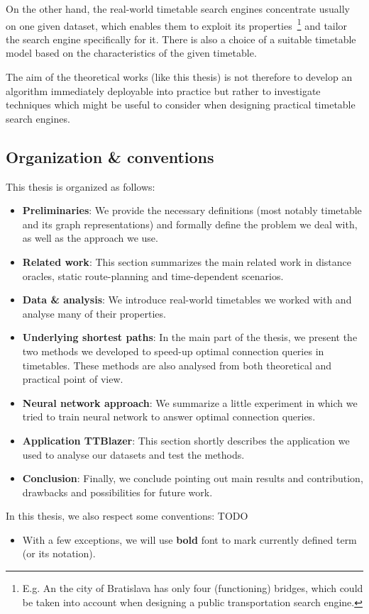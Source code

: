 	On the other hand, the real-world timetable search engines concentrate usually on one given dataset, which enables them to exploit its properties~\footnote{E.g. An the city of Bratislava has only four (functioning) bridges, which could be taken into account when designing a public transportation search engine.} and tailor the search engine specifically for it. There is also a choice of a suitable timetable model based on the characteristics of the given timetable.
	
	The aim of the theoretical works (like this thesis) is not therefore to develop an algorithm immediately deployable into practice but rather to investigate techniques which might be useful to consider when designing practical timetable search engines.
	
\subsection{Organization \& conventions}

	\noindent This thesis is organized as follows: 
	\begin{itemize}
		\item \textbf{Preliminaries}: We provide the necessary definitions (most notably timetable and its graph representations) and formally define the problem we deal with, as well as the approach we use.
		\item \textbf{Related work}: This section summarizes the main related work in distance oracles, static route-planning and time-dependent scenarios.
		\item \textbf{Data \& analysis}: We introduce real-world timetables we worked with and analyse many of their properties.
		\item \textbf{Underlying shortest paths}: In the main part of the thesis, we present the two methods we developed to speed-up optimal connection queries in timetables. These methods are also analysed from both theoretical and practical point of view.
		\item \textbf{Neural network approach}: We summarize a little experiment in which we tried to train neural network to answer optimal connection queries.
		\item \textbf{Application TTBlazer}: This section shortly describes the application we used to analyse our datasets and test the methods.
		\item \textbf{Conclusion}: Finally, we conclude pointing out main results and contribution, drawbacks and possibilities for future work.
	\end{itemize}
	\hspace{\fill}
	
	\noindent In this thesis, we also respect some conventions: TODO
	\begin{itemize}
		\item With a few exceptions, we will use \textbf{bold} font to mark currently defined term (or its notation).
	\end{itemize}
	